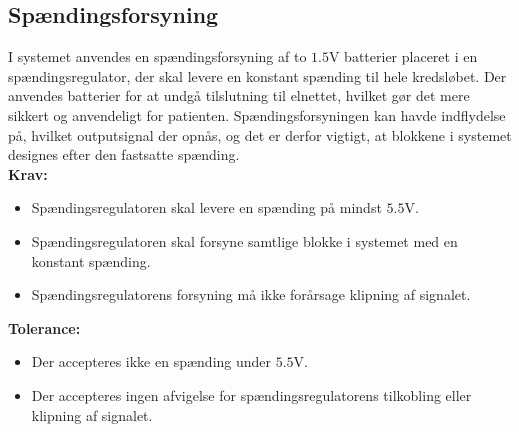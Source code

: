 \subsection{Spændingsforsyning}\label{Krav_spaending_spicifikt}
I systemet anvendes en spændingsforsyning af to $1.5$V batterier placeret i en spændingsregulator, der skal levere en konstant spænding til hele kredsløbet. Der anvendes batterier for at undgå tilslutning til elnettet, hvilket gør det mere sikkert og anvendeligt for patienten. Spændingsforsyningen kan havde indflydelse på, hvilket outputsignal der opnås, og det er derfor vigtigt, at blokkene i systemet designes efter den fastsatte spænding. \\
\noindent\textbf{Krav:}
\begin{itemize}
	\item Spændingsregulatoren skal levere en spænding på mindst $5.5$V.
	\item Spændingsregulatoren skal forsyne samtlige blokke i systemet med en konstant spænding.
	\item Spændingsregulatorens forsyning må ikke forårsage klipning af signalet.
\end{itemize}
\noindent\textbf{Tolerance:}
\begin{itemize}
	\item Der accepteres ikke en spænding under $5.5$V.
	\item Der accepteres ingen afvigelse for spændingsregulatorens tilkobling eller klipning af signalet.
\end{itemize}
